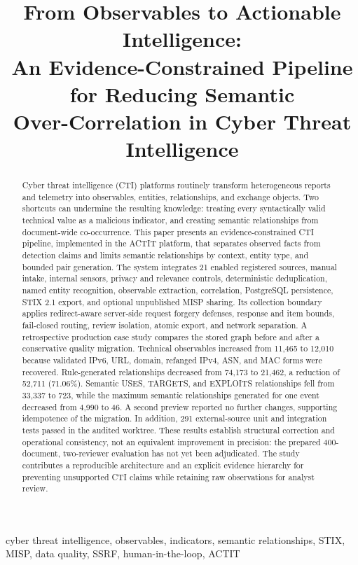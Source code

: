 \documentclass[conference]{IEEEtran}
\title{From Observables to Actionable Intelligence:\\
An Evidence-Constrained Pipeline for Reducing Semantic\\
Over-Correlation in Cyber Threat Intelligence}
\author{\IEEEauthorblockN{Ammar Aikan, Alaaldeen AL-Shuwaie, and Munif AL-Omisi}
\IEEEauthorblockA{University of Science and Technology--Yemen\\
Sana'a, Republic of Yemen\\
Email address(es)---to be added before submission}}
\begin{document}
\maketitle

\begin{abstract}
Cyber threat intelligence (CTI) platforms routinely transform heterogeneous reports and telemetry into observables, entities, relationships, and exchange objects. Two shortcuts can undermine the resulting knowledge: treating every syntactically valid technical value as a malicious indicator, and creating semantic relationships from document-wide co-occurrence. This paper presents an evidence-constrained CTI pipeline, implemented in the ACTIT platform, that separates observed facts from detection claims and limits semantic relationships by context, entity type, and bounded pair generation. The system integrates 21 enabled registered sources, manual intake, internal sensors, privacy and relevance controls, deterministic deduplication, named entity recognition, observable extraction, correlation, PostgreSQL persistence, STIX 2.1 export, and optional unpublished MISP sharing. Its collection boundary applies redirect-aware server-side request forgery defenses, response and item bounds, fail-closed routing, review isolation, atomic export, and network separation. A retrospective production case study compares the stored graph before and after a conservative quality migration. Technical observables increased from 11,465 to 12,010 because validated IPv6, URL, domain, refanged IPv4, ASN, and MAC forms were recovered. Rule-generated relationships decreased from 74,173 to 21,462, a reduction of 52,711 (71.06\%). Semantic USES, TARGETS, and EXPLOITS relationships fell from 33,337 to 723, while the maximum semantic relationships generated for one event decreased from 4,990 to 46. A second preview reported no further changes, supporting idempotence of the migration. In addition, 291 external-source unit and integration tests passed in the audited worktree. These results establish structural correction and operational consistency, not an equivalent improvement in precision: the prepared 400-document, two-reviewer evaluation has not yet been adjudicated. The study contributes a reproducible architecture and an explicit evidence hierarchy for preventing unsupported CTI claims while retaining raw observations for analyst review.
\end{abstract}

\begin{IEEEkeywords}
cyber threat intelligence, observables, indicators, semantic relationships, STIX, MISP, data quality, SSRF, human-in-the-loop, ACTIT
\end{IEEEkeywords}
\end{document}
